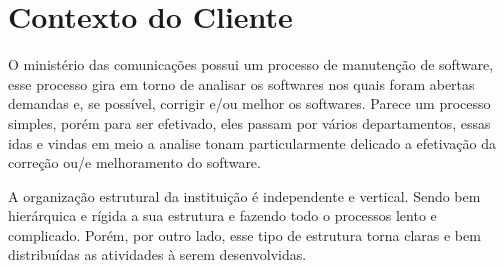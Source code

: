 \chapter[Contexto do Cliente]{Contexto do Cliente}\label{cap2}

O ministério das comunicações possui um processo de manutenção de software, esse
processo gira em torno de analisar os softwares nos quais foram abertas demandas
e, se possível, corrigir e/ou melhor os softwares. Parece um processo simples,
porém para ser efetivado, eles passam por vários departamentos, essas idas e vindas
em meio a analise tonam particularmente delicado a efetivação da correção ou/e melhoramento do software.

A organização estrutural da instituição é independente e vertical. Sendo bem hierárquica
e rígida a sua estrutura e fazendo todo o processos lento e complicado. Porém, por
outro lado, esse tipo de estrutura torna claras e bem distribuídas as atividades à serem desenvolvidas.
